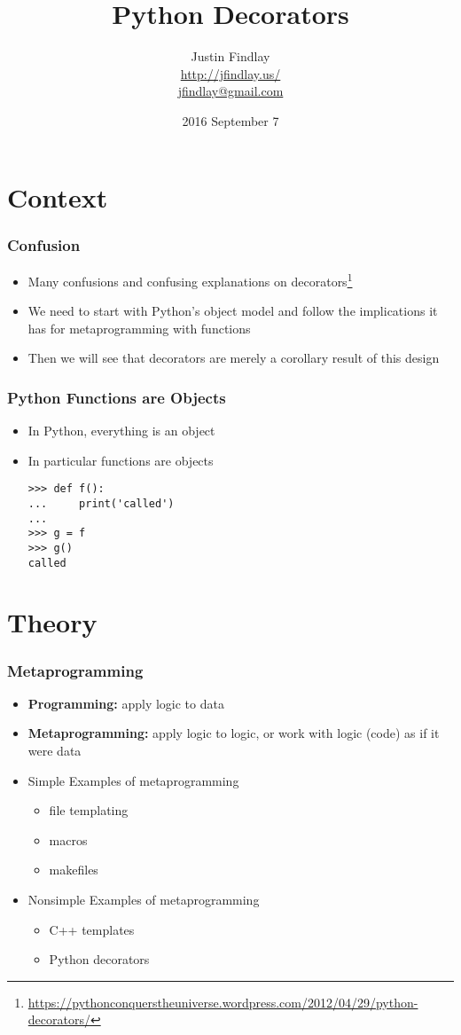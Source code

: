 \documentclass{beamer}
\title{Python Decorators}
\author{Justin Findlay \\ \url{http://jfindlay.us/} \\ \url{jfindlay@gmail.com}}
\date[SLC Python]{2016 September 7}
\begin{document}
\maketitle

\section{Context}

\begin{frame}
\frametitle{Confusion}
\begin{itemize}
  \item<2->{Many confusions and confusing explanations on decorators\footnote{\url{https://pythonconquerstheuniverse.wordpress.com/2012/04/29/python-decorators/}}}
  \item<3->{We need to start with Python's object model and follow the implications it has for metaprogramming with functions}
  \item<4->{Then we will see that decorators are merely a corollary result of this design}
\end{itemize}
\end{frame}

\begin{frame}[fragile]
\frametitle{Python Functions are Objects}
\begin{itemize}
  \item<1->{In Python, everything is an object}
  \item<2->{In particular functions are objects}
    \begin{verbatim}
>>> def f():
...     print('called')
...
>>> g = f
>>> g()
called
    \end{verbatim}
\end{itemize}
\end{frame}

\section{Theory}

\begin{frame}
\frametitle{Metaprogramming}
\begin{itemize}
  \item<2->{{\bf Programming:} apply logic to data}
  \item<3->{{\bf Metaprogramming:} apply logic to logic, or work with logic (code) as if it were data}
  \item<4->{Simple Examples of metaprogramming}
    \begin{itemize}
      \item<4->{file templating}
      \item<4->{macros}
      \item<4->{makefiles}
    \end{itemize}
  \item<5->{Nonsimple Examples of metaprogramming}
    \begin{itemize}
      \item<5->{C++ templates}
      \item<5->{Python decorators}
    \end{itemize}
\end{itemize}
\end{frame}
\end{document}
